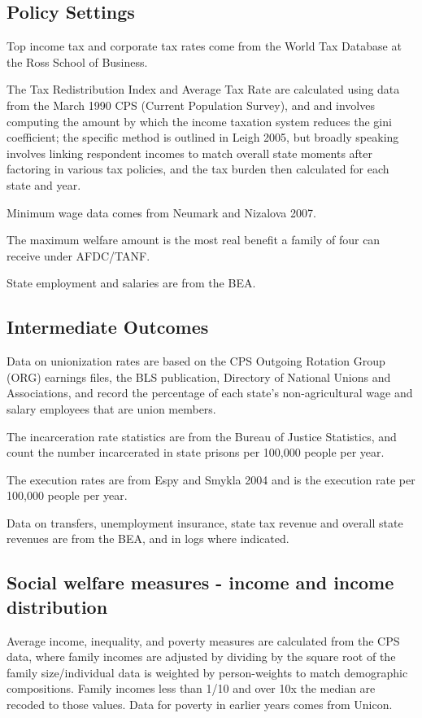 \documentclass{article}
\begin{document}
\subsection{Policy Settings}

Top income tax and corporate tax rates come from the World Tax Database at the Ross School of Business.

The Tax Redistribution Index and Average Tax Rate are calculated using data from the March 1990 CPS (Current Population Survey), and and involves computing the amount by which the income taxation system reduces the gini coefficient; the specific method is outlined in Leigh 2005, but broadly speaking involves linking respondent incomes to match overall state moments after factoring in various tax policies, and the tax burden then calculated for each state and year. 

Minimum wage data comes from Neumark and Nizalova 2007.

The maximum welfare amount is the most real benefit a family of four can receive under AFDC/TANF.

State employment and salaries are from the BEA.

\subsection{Intermediate Outcomes}

Data on unionization rates are based on the CPS Outgoing Rotation Group (ORG) earnings files, the BLS publication, Directory of National Unions and Associations, and record the percentage of each state's non-agricultural wage and salary employees that are union members.

The incarceration rate statistics are from the Bureau of Justice Statistics, and count the number incarcerated in state prisons per 100,000 people per year.

The execution rates are from Espy and Smykla 2004 and is the execution rate per 100,000 people per year.

Data on transfers, unemployment insurance, state tax revenue and overall state revenues are from the BEA, and in logs where indicated.

\subsection{Social welfare measures - income and income distribution}

Average income, inequality, and poverty measures are calculated from the CPS data, where family incomes are adjusted by dividing by the square root of the family size/individual data is weighted by person-weights to match demographic compositions. Family incomes less than 1/10 and over 10x the median are recoded to those values. Data for poverty in earlier years comes from Unicon.
\end{document}
